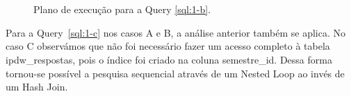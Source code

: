 \documentclass[a4paper,12pt]{article}
\begin{document}
\begin{figure}[hpt]
   \begin{center}
      \\
      \\
   \end{center}
   \caption{Plano de execução para a Query \ref{sql:1-b}.}
   \label{fig:plano_1-b}
\end{figure}

Para a Query~\ref{sql:1-c} nos casos A e B, a análise anterior também se aplica.
No caso C observámos que não foi necessário fazer um acesso completo à tabela ipdw\_respostas,
pois o índice foi criado na coluna semestre\_id. Dessa forma tornou-se possível 
a pesquisa sequencial através de um Nested Loop ao invés de um Hash Join.

\begin{program}
   
   \caption{Pergunta sobre seleção 1.c.}
   \label{sql:1-c}
\end{program}
\end{document}
